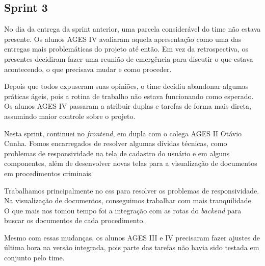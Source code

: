 \subsection{Sprint 3}

No dia da entrega da sprint anterior, uma parcela considerável do time não
estava presente. Os alunos AGES IV avaliaram aquela apresentação como uma das
entregas mais problemáticas do projeto até então. Em vez da retrospectiva, os
presentes decidiram fazer uma reunião de emergência para discutir o que estava
acontecendo, o que precisava mudar e como proceder.

Depois que todos expuseram suas opiniões, o time decidiu abandonar algumas
práticas ágeis, pois a rotina de trabalho não estava funcionando como esperado.
Os alunos AGES IV passaram a atribuir duplas e tarefas de forma mais direta,
assumindo maior controle sobre o projeto.

Nesta sprint, continuei no \textit{frontend}, em dupla com o colega AGES II
Otávio Cunha. Fomos encarregados de resolver algumas dívidas técnicas, como
problemas de responsividade na tela de cadastro do usuário e em alguns
componentes, além de desenvolver novas telas para a visualização de documentos
em procedimentos criminais.

Trabalhamos principalmente no \ac{css} para resolver os problemas de
responsividade. Na visualização de documentos, conseguimos trabalhar com mais
tranquilidade. O que mais nos tomou tempo foi a integração com as rotas do
\textit{backend} para buscar os documentos de cada procedimento.

Mesmo com essas mudanças, os alunos AGES III e IV precisaram fazer ajustes de
última hora na versão integrada, pois parte das tarefas não havia sido testada
em conjunto pelo time.

\medskip
\noindent{}
